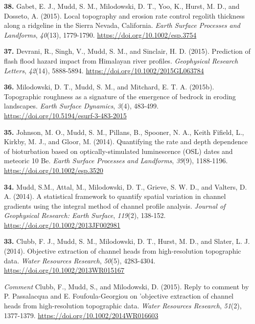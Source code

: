 \documentclass[10pt, a4paper]{article}
\newcommand{\years}[1]{\marginnote{\scriptsize #1}}
\begin{document}
\years{2015}\hangindent=0.7cm\textbf{38. }Gabet, E. J., Mudd, S. M., Milodowski, D. T., Yoo, K., Hurst, M. D., and Dosseto, A. (2015). Local topography and erosion rate control regolith thickness along a ridgeline in the Sierra Nevada, California. \textit{Earth Surface Processes and Landforms}, \textit{40}(13), 1779-1790. \href{https://doi.org/10.1002/esp.3754}{https://doi.org/10.1002/esp.3754}\par
\years{2015}\hangindent=0.7cm\textbf{37. }Devrani, R., Singh, V., Mudd, S. M., and Sinclair, H. D. (2015). Prediction of flash flood hazard impact from Himalayan river profiles. \textit{Geophysical Research Letters}, \textit{42}(14), 5888-5894. \href{https://doi.org/10.1002/2015GL063784}{https://doi.org/10.1002/2015GL063784}\par
\years{2015}\hangindent=0.7cm\textbf{36. }Milodowski, D. T., Mudd, S. M., and Mitchard, E. T. A. (2015b). Topographic roughness as a signature of the emergence of bedrock in eroding landscapes. \textit{Earth Surface Dynamics}, \textit{3}(4), 483-499. \href{https://doi.org/10.5194/esurf-3-483-2015}{https://doi.org/10.5194/esurf-3-483-2015}\par

\years{2014}\hangindent=0.7cm\textbf{35. }Johnson, M. O., Mudd, S. M., Pillans, B., Spooner, N. A., Keith Fifield, L., Kirkby, M. J., and Gloor, M. (2014). Quantifying the rate and depth dependence of bioturbation based on optically-stimulated luminescence (OSL) dates and meteoric 10 Be. \textit{Earth Surface Processes and Landforms}, \textit{39}(9), 1188-1196. \href{https://doi.org/10.1002/esp.3520}{https://doi.org/10.1002/esp.3520}\par
\years{2014}\hangindent=0.7cm\textbf{34. }Mudd, S.M., Attal, M., Milodowski, D. T., Grieve, S. W. D., and Valters, D. A. (2014). A statistical framework to quantify spatial variation in channel gradients using the integral method of channel profile analysis. \textit{Journal of Geophysical Research: Earth Surface}, \textit{119}(2), 138-152. \href{https://doi.org/10.1002/2013JF002981}{https://doi.org/10.1002/2013JF002981}\par


\years{2014}\hangindent=0.7cm\textbf{33. }Clubb, F. J., Mudd, S. M., Milodowski, D. T., Hurst, M. D., and Slater, L. J. (2014). Objective extraction of channel heads from high-resolution topographic data. \textit{Water Resources Research}, \textit{50}(5), 4283-4304. \href{https://doi.org/10.1002/2013WR015167}{https://doi.org/10.1002/2013WR015167}\par
\begin{footnotesize}
\hangindent=0.7cm\textit{Comment }Clubb, F., Mudd, S., and Milodowski, D. (2015). Reply to comment by P. Passalacqua and E. Foufoula-Georgiou on 'objective extraction of channel heads from high-resolution topographic data. \textit{Water Resources Research}, \textit{51}(2), 1377-1379. \href{https://doi.org/10.1002/2014WR016603}{https://doi.org/10.1002/2014WR016603}\par
\end{footnotesize}
\end{document}
